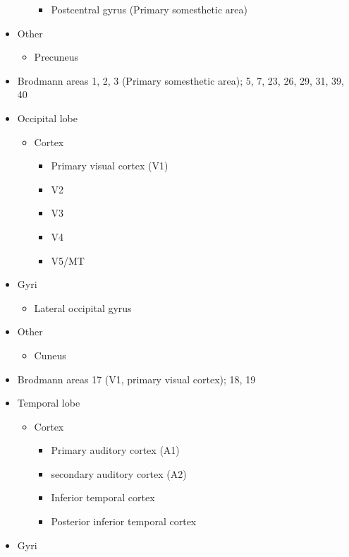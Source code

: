 \begin{itemize}
\begin{itemize}
    \begin{itemize}
    \tightlist
    \item
      Postcentral gyrus (Primary somesthetic area)
    \end{itemize}
  \end{itemize}
\item
  Other

  \begin{itemize}
  \tightlist
  \item
    Precuneus
  \end{itemize}
\item
  Brodmann areas 1, 2, 3 (Primary somesthetic area); 5, 7, 23, 26, 29, 31, 39, 40
\item
  Occipital lobe

  \begin{itemize}
  \tightlist
  \item
    Cortex

    \begin{itemize}
    \tightlist
    \item
      Primary visual cortex (V1)
    \item
      V2
    \item
      V3
    \item
      V4
    \item
      V5/MT
    \end{itemize}
  \end{itemize}
\item
  Gyri

  \begin{itemize}
  \tightlist
  \item
    Lateral occipital gyrus
  \end{itemize}
\item
  Other

  \begin{itemize}
  \tightlist
  \item
    Cuneus
  \end{itemize}
\item
  Brodmann areas 17 (V1, primary visual cortex); 18, 19
\item
  Temporal lobe

  \begin{itemize}
  \tightlist
  \item
    Cortex

    \begin{itemize}
    \tightlist
    \item
      Primary auditory cortex (A1)
    \item
      secondary auditory cortex (A2)
    \item
      Inferior temporal cortex
    \item
      Posterior inferior temporal cortex
    \end{itemize}
  \end{itemize}
\item
  Gyri


\end{itemize}
